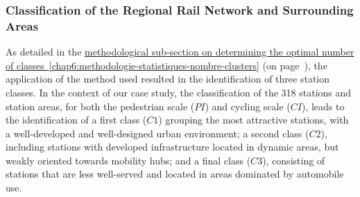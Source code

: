 \begin{refsegment}
\subsubsection*{Classification of the Regional Rail Network and Surrounding Areas
    \label{chap6:results-classification-gares-classes}
    }

As detailed in the \hyperref[chap6:methodologie-statistiques-nombre-clusters]{methodological sub-section on determining the optimal number of classes~\ref{chap6:methodologie-statistiques-nombre-clusters}} (on page~\pageref{chap6:methodologie-statistiques-nombre-clusters}), the application of the method used resulted in the identification of three station classes. In the context of our case study, the classification of the 318 stations and station areas, for both the pedestrian scale (\(PI\)) and cycling scale (\(CI\)), leads to the identification of a first class (\(C1\)) grouping the most attractive stations, with a well-developed and well-designed urban environment; a second class (\(C2\)), including stations with developed infrastructure located in dynamic areas, but weakly oriented towards mobility hubs; and a final class (\(C3\)), consisting of stations that are less well-served and located in areas dominated by automobile use.%


\end{refsegment}
